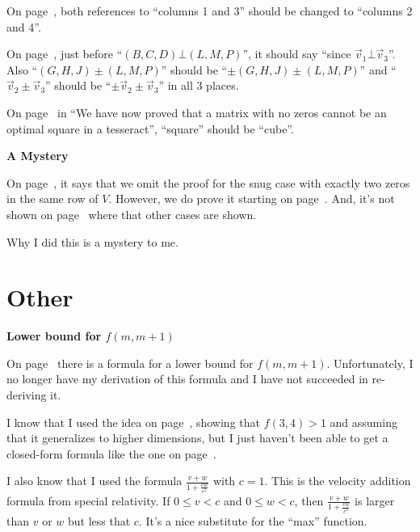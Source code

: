 On page~\pageref{refpage25}, both references to ``columns 1 and 3'' should be
changed to ``columns 2 and 4''.

On page~\pageref{refpage26}, just before ``$(B,C,D) \bot (L,M,P)$'', it should
say ``since $\vec{v}_1 \bot \vec{v}_3$''.  Also ``$(G,H,J) \pm (L,M,P)$''
should be ``$\pm (G,H,J) \pm (L,M,P)$'' and ``$\vec{v}_2 \pm \vec{v}_3$''
should be ``$\pm \vec{v}_2 \pm \vec{v}_3$'' in all 3 places.

On page~\pageref{refpage27} in ``We have now proved that a matrix with no zeros
cannot be an optimal square in a tesseract'', ``square'' should be ``cube''.

\begin{center}
{\bf A Mystery}
\end{center}
\vspace{-0.1in}
On page~\pageref{refpage21}, it says that we omit the proof for the snug case
with exactly two zeros in the same row of $V$.  However, we do prove it
starting on page~\pageref{refpage22}.  And, it's not shown on
page~\pageref{refpage23} where that other cases are shown.

Why I did this is a mystery to me.
\newpage

\section{Other}
\begin{center}
{\bf Lower bound for $f(m,m+1)$}
\end{center}
\vspace{-0.1in}
On page~\pageref{refpage28} there is a formula for a lower bound for
$f(m,m+1)$.  Unfortunately, I no longer have my derivation of this formula and
I have not succeeded in re-deriving it.

I know that I used the idea on page~\pageref{refpage29}, showing that $f(3,4)
> 1$ and assuming that it generalizes to higher dimensions, but I just haven't
been able to get a closed-form formula like the one on
page~\pageref{refpage28}.

I also know that I used the formula $\frac{v+w}{1+\frac{vw}{c^2}}$ with $c =
1$.  This is the velocity addition formula from special relativity.  If $0
\leq v < c$ and $0 \leq w < c$, then $\frac{v+w}{1+\frac{vw}{c^2}}$ is larger
than $v$ or $w$ but less that $c$.  It's a nice substitute for the ``max''
function.
\newpage
